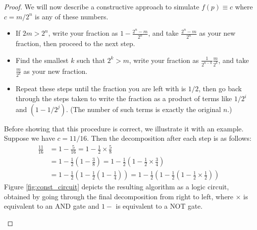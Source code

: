 \documentclass{article}
\theoremstyle{definition}
\begin{document}
\begin{proof}
We will now describe a constructive approach to simulate $f(p)\equiv c$ where $c = m/2^n$ is any of these numbers.
\begin{itemize}
\item If $2m > 2^n$, write your fraction as $1 - \frac{2^n - m}{2^n}$, and take $\frac{2^n - m}{2^n}$ as your new fraction, then proceed to the next step.
\item Find the smallest $k$ such that $2^k > m$, write your fraction as $\frac{1}{2^{n-k}}\frac{m}{2^k}$, and take $\frac{m}{2^k}$ as your new fraction.
\item Repeat these steps until the fraction you are left with is $1/2$, then go back through the steps taken to write the fraction as a product of terms like $1/2^i$ and $(1-1/2^j)$. (The number of such terms is exactly the original $n$.)
\end{itemize}
Before showing that this procedure is correct, we illustrate it with an example.
Suppose we have $c = 11/16$.
Then the decomposition after each step is as follows:
\begin{align*}
\frac{11}{16} &= 1- \frac{5}{16} 
= 1 - \frac{1}{2} \times \frac{5}{8} \\
&= 1 - \frac{1}{2} \left(1 - \frac{3}{8}\right) 
= 1 - \frac{1}{2} \left(1 - \frac{1}{2} \times \frac{3}{4}\right) \\
&= 1 - \frac{1}{2} \left(1 - \frac{1}{2}\left(1-\frac{1}{4}\right)\right)
= 1 - \frac{1}{2} \left(1 - \frac{1}{2}\left(1-\frac{1}{2} \times \frac{1}{2}\right)\right)
\end{align*}
Figure \ref{fig:const_circuit} depicts the resulting algorithm as a logic circuit, obtained by going through the final decomposition from right to left, where $\times$ is equivalent to an {\footnotesize AND} gate and $1-$ is equivalent to a {\footnotesize NOT} gate.

\begin{figure}
\centering
{}
\end{figure}
\end{proof}
\end{document}

